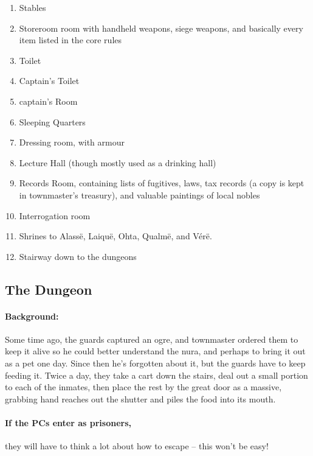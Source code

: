 \begin{multicols}{2}
\begin{enumerate}
  \item
  Stables\label{stationStables}
  \item
  Storeroom room with handheld weapons, siege weapons, and basically every item listed in the core rules
  \label{stationStorage}
  \item
  Toilet
  \label{stationToilet}
  \item
  Captain's Toilet
  \label{stationCaptainToilet}
  \item
  \gls{captain}'s Room
  \label{stationCaptainRoom}
  \item
  Sleeping Quarters
  \label{stationSleep}
  \item
  Dressing room, with armour
  \label{stationDressing}
  \item
  Lecture Hall (though mostly used as a drinking hall)
  \label{stationLecture}
  \item
  Records Room, containing lists of fugitives, laws, tax records (a copy is kept in \gls{townmaster}'s treasury), and valuable paintings of local nobles
  \label{stationRecords}
  \item
  Interrogation room
  \label{stationInterrogation}
  \item
  Shrines to Alass\"{e}, Laiqu\"{e}, Ohta, Qualm\"{e}, and V\'{e}r\"{e}.
  \label{stationShrine}
  \item
  Stairway down to the dungeons
  \label{stationStairs}
\end{enumerate}

\subsection{The Dungeon}
\label{stationDungeon}

\paragraph{Background:}
Some time ago, the guards captured an ogre, and \gls{townmaster} ordered them to keep it alive so he could better understand the nura, and perhaps to bring it out as a pet one day.  Since then he's forgotten about it, but the guards have to keep feeding it.  Twice a day, they take a cart down the stairs, deal out a small portion to each of the inmates, then place the rest by the great door as a massive, grabbing hand reaches out the shutter and piles the food into its mouth.

\paragraph{If the PCs enter as prisoners,}
they will have to think a lot about how to escape -- this won't be easy!


\end{multicols}
